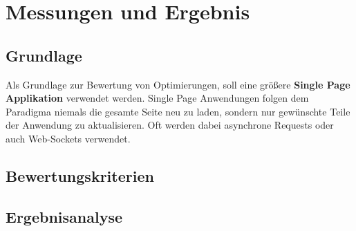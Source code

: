 \section{Messungen und Ergebnis}
\subsection{Grundlage}
Als Grundlage zur Bewertung von Optimierungen, soll eine größere \textbf{Single Page Applikation} verwendet werden. Single Page Anwendungen folgen dem Paradigma niemals die gesamte Seite neu zu laden, sondern nur gewünschte Teile der Anwendung zu aktualisieren. Oft werden dabei asynchrone Requests oder auch Web-Sockets verwendet.

\subsection{Bewertungskriterien}

\subsection{Ergebnisanalyse}

